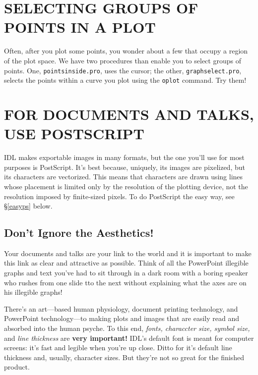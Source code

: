 \documentclass[psfig,preprint]{aastex}
\begin{document}
\section{SELECTING GROUPS OF POINTS IN A PLOT}

Often, after you plot some points, you wonder about a few that occupy a
region of the plot space. We have two procedures than enable you to
select groups of points. One, {\tt pointsinside.pro}, uses the cursor;
the other, {\tt graphselect.pro}, selects the points within a curve you
plot using the {\tt oplot} command. Try them!

\section{FOR DOCUMENTS AND TALKS, USE POSTSCRIPT} \label{doctalks}

IDL makes exportable images in many formats, but the one you'll use for
most purposes is PostScript. It's best because, uniquely, its images are
pixelized, but its characters are vectorized. This means that characters
are drawn using lines whose placement is limited only by the resolution
of the plotting device, not the resolution imposed by finite-sized
pixels. To do PostScript the easy way, see \S \ref{easyps} below.

\subsection{Don't Ignore the Aesthetics!}\label{psfiles}
Your documents and talks are your link to the world and it is important
to make this link as clear and attractive as possible. Think of all the
PowerPoint illegible graphs and text you've had to sit through in a dark
room with a boring speaker who rushes from one slide tto the next
without explaining what the axes are on his illegible graphs! 

There's an art---based human physiology, document printing technology,
and PowerPoint technology---to making plots and images that are easily
read and absorbed into the human psyche.  To this
end, {\it fonts, characcter size, symbol size,} and {\it line thickness}
are {\bf very important!} IDL's default font is meant for computer
screens: it's fast and legible when you're up close. Ditto for it's
default line thickness and, usually, character sizes. But they're not so
great for the finished product.
\end{document}
